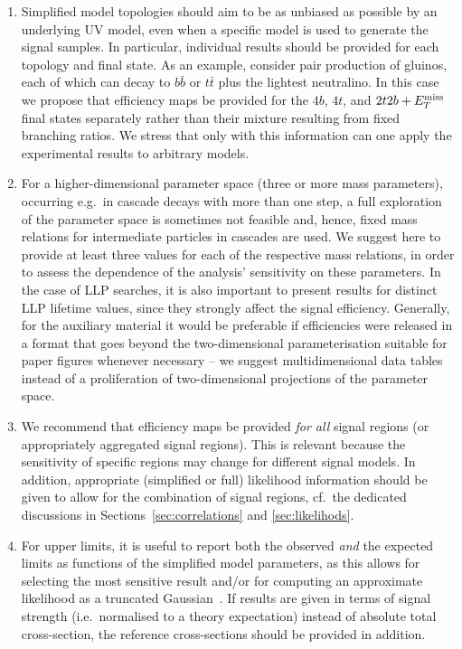 \documentclass[a4paper,aps,prd,longbibliography,notitlepage,showpacs,amsmath,amssymb,superscriptaddress,nofootinbib,floatfix,11pt,preprintnumbers]{revtex4-1-mod}
\newcommand{\ie}{i.e.\xspace}
\newcommand{\eg}{e.g.\xspace}
\renewcommand{\emph}[1]{\textit{#1}}
\begin{document}
\begin{enumerate}

\item Simplified model topologies should aim to be as unbiased as possible by an underlying UV model, even when a specific model is used to generate the signal samples. In particular, individual results should be provided for each topology and final state. As an example, consider pair production of gluinos, each of which can decay to $b\bar b$ or $t\bar t$ plus the lightest  neutralino. In this case we propose that efficiency maps be provided for the $4b$, $4t$, and $2t2b+E_T^{\rm miss}$ final states separately rather than their mixture resulting from fixed branching ratios.
We stress that only with this information can one apply the experimental results to arbitrary models.

\item For a higher-dimensional parameter space (three or more mass parameters), occurring \eg~in cascade decays with more than one step, a full exploration of the parameter space is sometimes not feasible and, hence, fixed mass relations for intermediate particles in cascades are used. We suggest here to provide at least three values for each of the respective mass relations, in order to assess the dependence of the analysis' sensitivity on these parameters.
In the case of LLP searches, it is also important to present results for distinct LLP lifetime values, since they strongly affect the signal efficiency.
Generally, for the auxiliary material it would be preferable if efficiencies were released in a format that goes beyond the two-dimensional parameterisation suitable for paper figures whenever necessary -- we suggest multidimensional data tables instead of a proliferation of two-dimensional projections of the parameter space.

\item We recommend that efficiency maps be provided \emph{for all} signal regions (or appropriately aggregated signal regions). This is relevant because the sensitivity of specific regions may change for different signal models. In addition, appropriate (simplified or full) likelihood information should be given to allow for the combination of signal regions, cf.\ the dedicated discussions in Sections~\ref{sec:correlations} and \ref{sec:likelihods}.

\item For upper limits, it is useful to report both the observed \emph{and} the expected limits as functions of the simplified model parameters, as  this allows for selecting the most sensitive result and/or for computing an approximate likelihood as a truncated Gaussian~\cite{Azatov:2012bz}.
If results are given in terms of signal strength (\ie~normalised to a theory expectation) instead of absolute total cross-section, the reference cross-sections should be provided in addition.


\end{enumerate}
\end{document}
